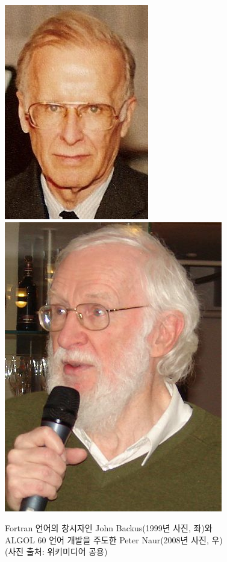 \documentclass[b5paper,chapter,figtabcapt]{oblivoir}
\begin{document}
\begin{figure}\centering
\includegraphics[scale=0.25]{imgs/JohnBackus.jpg}
\qquad\qquad\qquad
\includegraphics[scale=0.21]{imgs/PeterNaur.jpg}
\caption{Fortran 언어의 창시자인 John Backus(1999년 사진, 좌)와\\
         ALGOL 60 언어 개발을 주도한 Peter Naur(2008년 사진, 우)\\
         {\scriptsize(사진 출처: 위키미디어 공용)}\label{fig:BackusNaur}}
\end{figure}
\end{document}
